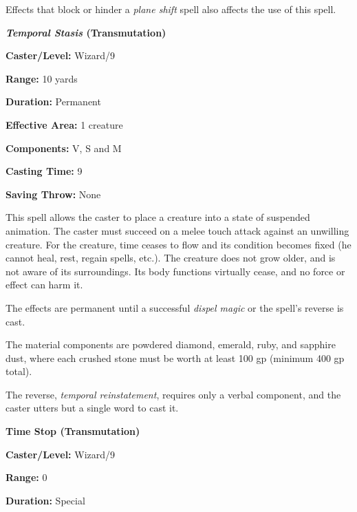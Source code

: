 \begin{multicols}{2}
Effects that block or hinder a \textit{plane shift} spell also affects the use of this spell.

\vspace{1em}

\noindent
\begin{minipage}{\columnwidth}

\noindent \textbf{\textit{Temporal Stasis} (Transmutation)}

\noindent \textbf{Caster/Level:} Wizard/9

\noindent \textbf{Range:} 10 yards

\noindent \textbf{Duration:} Permanent

\noindent \textbf{Effective Area:} 1 creature

\noindent \textbf{Components:} V, S and M

\noindent \textbf{Casting Time:} 9

\noindent \textbf{Saving Throw:} None

\end{minipage}

This spell allows the caster to place a creature into a state of suspended animation.  The caster must succeed on a melee touch attack against an unwilling creature.  For the creature, time ceases to flow and its condition becomes fixed (he cannot heal, rest, regain spells, etc.).  The creature does not grow older, and is not aware of its surroundings.  Its body functions virtually cease, and no force or effect can harm it.

The effects are permanent until a successful \textit{dispel magic} or the spell's reverse is cast.  

The material components are powdered diamond, emerald, ruby, and sapphire dust, where each crushed stone must be worth at least 100 gp (minimum 400 gp total).

The reverse, \textit{temporal reinstatement}, requires only a verbal component, and the caster utters but a single word to cast it.

\vspace{1em}

\noindent
\begin{minipage}{\columnwidth}

\noindent \textbf{Time Stop (Transmutation)}

\noindent \textbf{Caster/Level:} Wizard/9

\noindent \textbf{Range:} 0

\noindent \textbf{Duration:} Special


\end{minipage}
\end{multicols}
